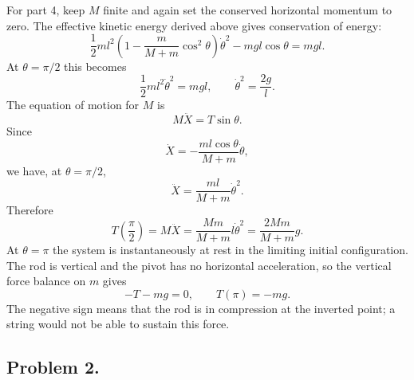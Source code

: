 \begin{solution}
For part 4, keep $M$ finite and again set the conserved horizontal momentum to zero. The effective kinetic energy derived above gives conservation of energy:
\[
    \frac{1}{2}ml^2\left(1-\frac{m}{M+m}\cos^2\theta\right)\dot\theta^2
    -mgl\cos\theta=mgl .
\]
At $\theta=\pi/2$ this becomes
\[
    \frac{1}{2}ml^2\dot\theta^2=mgl,
    \qquad
    \dot\theta^2=\frac{2g}{l}.
\]
The equation of motion for $M$ is
\[
    M\ddot X=T\sin\theta .
\]
Since
\[
    \dot X=-\frac{ml\cos\theta}{M+m}\dot\theta,
\]
we have, at $\theta=\pi/2$,
\[
    \ddot X=\frac{ml}{M+m}\dot\theta^2.
\]
Therefore
\[
    T\left(\frac{\pi}{2}\right)
    =M\ddot X
    =\frac{Mm}{M+m}l\dot\theta^2
    =\frac{2Mm}{M+m}g .
\]
At $\theta=\pi$ the system is instantaneously at rest in the limiting initial configuration. The rod is vertical and the pivot has no horizontal acceleration, so the vertical force balance on $m$ gives
\[
    -T-mg=0,
    \qquad
    T(\pi)=-mg .
\]
The negative sign means that the rod is in compression at the inverted point; a string would not be able to sustain this force.
\end{solution}

\subsection*{Problem 2.}

